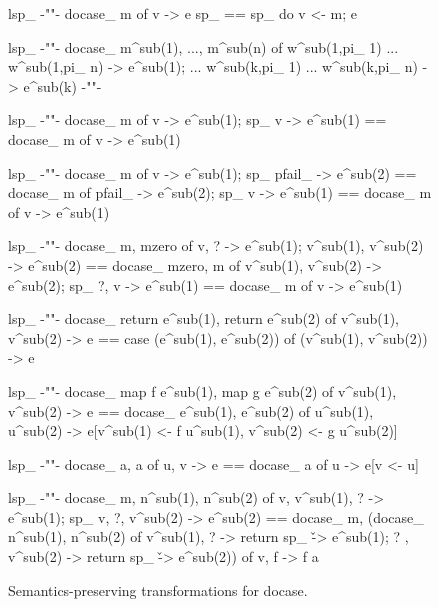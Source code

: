 \documentclass[preprint]{sigplanconf}
\begin{document}
\begin{figure}
\begin{code}
lsp_
{-""-}
  docase_ m of v -> e sp_ == sp_ do v <- m; e

lsp_
{-""-}
  docase_ m^sub(1), ..., m^sub(n) of
    w^sub(1,pi_ 1) ... w^sub(1,pi_ n) -> e^sub(1); ...
    w^sub(k,pi_ 1) ... w^sub(k,pi_ n) -> e^sub(k)
  {-""-}

lsp_
{-""-}
    docase_ m of v -> e^sub(1); sp_ v -> e^sub(1)
==  docase_ m of v -> e^sub(1)

lsp_
{-""-}
    docase_ m of v       -> e^sub(1); sp_ pfail_  -> e^sub(2)
==  docase_ m of pfail_  -> e^sub(2); sp_ v       -> e^sub(1)
==  docase_ m of v       -> e^sub(1)

lsp_
{-""-}
    docase_ m, mzero of v, ?                -> e^sub(1);      v^sub(1), v^sub(2)  -> e^sub(2)
==  docase_ mzero, m of v^sub(1), v^sub(2)  -> e^sub(2); sp_  ?, v                -> e^sub(1)
==  docase_ m of v -> e^sub(1)

lsp_
{-""-}
    docase_  return e^sub(1), return e^sub(2) of v^sub(1), v^sub(2) -> e
==  case (e^sub(1), e^sub(2)) of (v^sub(1), v^sub(2)) -> e

lsp_
{-""-}
    docase_ map f e^sub(1), map g e^sub(2) of v^sub(1), v^sub(2) -> e
==  docase_ e^sub(1), e^sub(2) of u^sub(1), u^sub(2) -> e[v^sub(1) <- f u^sub(1), v^sub(2) <- g u^sub(2)]

lsp_
{-""-}
    docase_ a, a of u, v -> e
==  docase_ a of u -> e[v <- u]

lsp_
{-""-}
    docase_ m, n^sub(1), n^sub(2) of 
      v, v^sub(1), ? -> e^sub(1); sp_ v, ?, v^sub(2) -> e^sub(2)
==  docase_ m, (docase_ n^sub(1), n^sub(2) of
      v^sub(1), ? -> return sp_ \v -> e^sub(1); 
      ? , v^sub(2) -> return sp_ \v -> e^sub(2)) of v, f -> f a
\end{code}

\caption{ Semantics-preserving transformations for docase. }
\label{fig:transformations}
\end{figure}
\end{document}
